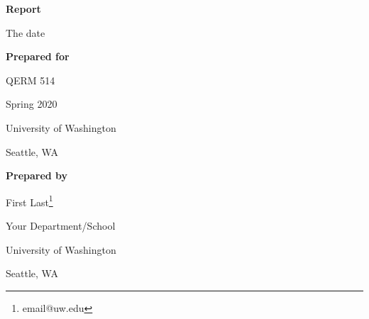 \begin{center}

\textbf{Report}

The date

\vspace{0.25in}

\textbf{Prepared for}

QERM 514

\setlength{\parskip}{0pt}

Spring 2020

University of Washington   

Seattle, WA

\setlength{\parskip}{8pt}

\vspace{0.25in}

\textbf{Prepared by}

First Last\footnote{email@uw.edu}

\small

Your Department/School

\setlength{\parskip}{0pt}

University of Washington

Seattle, WA

\normalsize

\setlength{\parskip}{8pt}

\end{center}

\newpage

